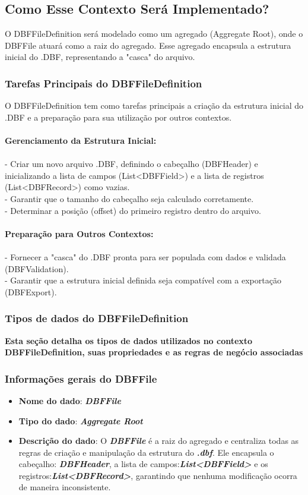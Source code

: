\subsection{Como Esse Contexto Será Implementado?}
O DBFFileDefinition será modelado como um agregado (Aggregate Root), onde o DBFFile atuará como a raiz do agregado. Esse agregado encapsula a estrutura inicial do .DBF, representando a "casca" do arquivo.
\subsubsection{Tarefas Principais do DBFFileDefinition}
O DBFFileDefinition tem como tarefas principais a criação da estrutura inicial do .DBF e a preparação para sua utilização por outros contextos. \\\\
\textbf{Gerenciamento da Estrutura Inicial:} \\\\
- Criar um novo arquivo .DBF, definindo o cabeçalho (DBFHeader) e inicializando a lista de campos (List<DBFField>) e a lista de registros (List<DBFRecord>) como vazias. \\
- Garantir que o tamanho do cabeçalho seja calculado corretamente. \\
- Determinar a posição (offset) do primeiro registro dentro do arquivo. \\\\
\textbf{Preparação para Outros Contextos:} \\\\
- Fornecer a "casca" do .DBF pronta para ser populada com dados e validada (DBFValidation). \\
- Garantir que a estrutura inicial definida seja compatível com a exportação (DBFExport). \\

\subsubsection{Tipos de dados do DBFFileDefinition}
\textbf{Esta seção detalha os tipos de dados utilizados no contexto DBFFileDefinition, suas propriedades e as regras de negócio associadas}

\subsubsection{Informações gerais do DBFFile}
\begin{itemize}
    \item \textbf{Nome do dado}: \textit{\textbf{DBFFile}}
    \item \textbf{Tipo do dado}: \textit{\textbf{Aggregate Root}}
    \item \textbf{Descrição do dado}: O \textit{\textbf{DBFFile}} é a raiz do agregado e centraliza todas as regras de criação e manipulação da estrutura do \textit{\textbf{.dbf}}. Ele encapsula o cabeçalho: \textit{\textbf{DBFHeader}}, a lista de campos:\textit{\textbf{List<DBFField>}} e os registros:\textit{\textbf{List<DBFRecord>}}, garantindo que nenhuma modificação ocorra de maneira inconsistente.
\end{itemize}


